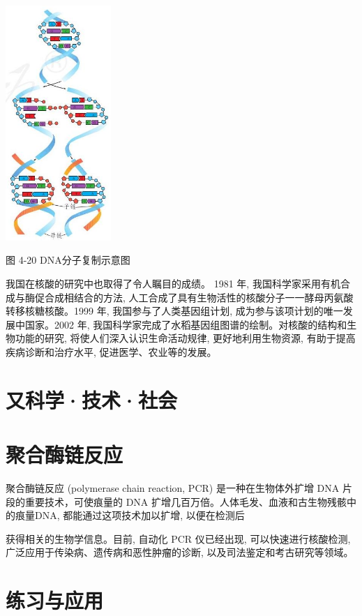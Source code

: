 \documentclass[10pt]{article}
\begin{document}
\begin{center}
\includegraphics[max width=0.3\textwidth]{images/0190efc5-b58a-7c43-bfb0-e0a030df9cfd_130_365442.jpg}
\end{center}

图 4-20 DNA分子复制示意图

我国在核酸的研究中也取得了令人瞩目的成绩。 1981 年, 我国科学家采用有机合成与酶促合成相结合的方法, 人工合成了具有生物活性的核酸分子一一酵母丙氨酸转移核糖核酸。1999 年, 我国参与了人类基因组计划, 成为参与该项计划的唯一发展中国家。2002 年, 我国科学家完成了水稻基因组图谱的绘制。对核酸的结构和生物功能的研究, 将使人们深入认识生命活动规律, 更好地利用生物资源, 有助于提高疾病诊断和治疗水平, 促进医学、农业等的发展。

\section*{又科学·技术·社会}

\section*{聚合酶链反应}

聚合酶链反应 (polymerase chain reaction, PCR) 是一种在生物体外扩增 DNA 片段的重要技术，可使痕量的 DNA 扩增几百万倍。人体毛发、血液和古生物残骸中的痕量DNA, 都能通过这项技术加以扩增, 以便在检测后

获得相关的生物学信息。目前, 自动化 PCR 仪已经出现, 可以快速进行核酸检测, 广泛应用于传染病、遗传病和恶性肿瘤的诊断, 以及司法鉴定和考古研究等领域。

\section*{练习与应用}
\end{document}
